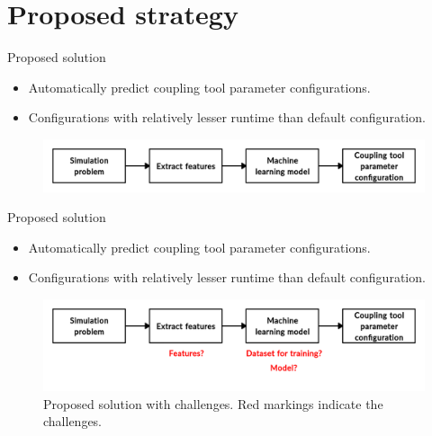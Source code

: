 \documentclass[10pt]{beamer}
\begin{document}
\section{Proposed strategy}

\begin{frame}[t]{Proposed solution}


\begin{itemize}
    \item Automatically predict coupling tool parameter configurations.
    \newline
    \item Configurations with relatively lesser runtime than default configuration.
\end{itemize} 
\begin{figure}[h!]
\centering
\includegraphics[width=\linewidth]{images/proposedstrategy_gen.jpg}
\label{fig:simplegoal}
\end{figure}  
    
\end{frame}

\begin{frame}[t, noframenumbering]{Proposed solution}

\begin{itemize}
    \item Automatically predict coupling tool parameter configurations.
    \newline
    \item Configurations with relatively lesser runtime than default configuration.
\end{itemize} 
\begin{figure}[h!]
\centering
\includegraphics[trim={0 3cm 0 0},width=\linewidth]{images/proposedstrategy_challenge.jpg}
\caption{Proposed solution with challenges. Red markings indicate the challenges.}
\label{fig:simplegoal_challenge}
\end{figure}  
    
\end{frame}
\end{document}
